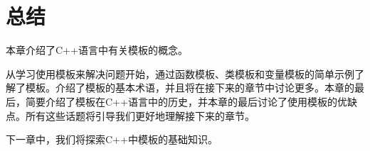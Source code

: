 \section{总结}
本章介绍了C++语言中有关模板的概念。

从学习使用模板来解决问题开始，通过函数模板、类模板和变量模板的简单示例了解了模板。介绍了模板的基本术语，并且将在接下来的章节中讨论更多。本章的最后，简要介绍了模板在C++语言中的历史，并本章的最后讨论了使用模板的优缺点。所有这些话题将引导我们更好地理解接下来的章节。

下一章中，我们将探索C++中模板的基础知识。